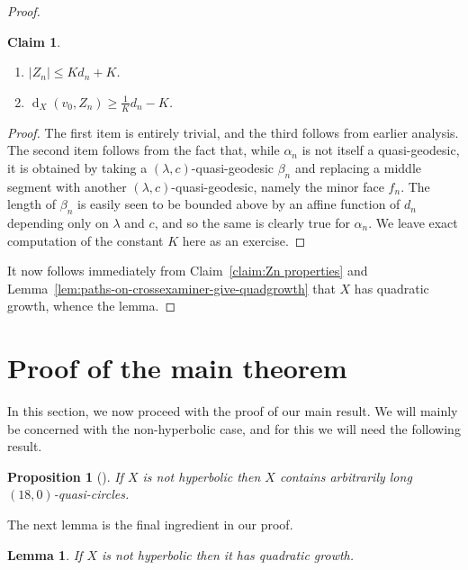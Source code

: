 \documentclass[11pt,a4paper]{amsart}
\DeclareMathOperator{\dist}{d}
\newtheorem{proposition}[theorem]{Proposition}
\newtheorem{lemma}[theorem]{Lemma}
\newtheorem{claim}[theorem]{Claim}
\theoremstyle{definition}
\begin{document}
\begin{proof}
\begin{claim}
\begin{enumerate}
            \item $|Z_n| \leq Kd_n + K$.

            \item $\dist_X(v_0,Z_n) \geq \frac 1 K d_n - K$. 
        \end{enumerate}
    \end{claim}

    \begin{proof}
        The first item is entirely trivial, and the third follows from earlier analysis. The second item follows from the fact that, while $\alpha_n$ is not itself a quasi-geodesic, it is obtained by taking a $(\lambda,c)$-quasi-geodesic $\beta_n$ and replacing a middle segment with another $(\lambda,c)$-quasi-geodesic, namely the minor face $f_n$. The length of $\beta_n$ is easily seen to be bounded above by an affine function of $d_n$ depending only on $\lambda$ and $c$, and so the same is clearly true for $\alpha_n$. We leave exact computation of the constant $K$ here as an exercise.  
    \end{proof}
    
    It now follows immediately from Claim~\ref{claim:Zn properties} and Lemma~\ref{lem:paths-on-crossexaminer-give-quadgrowth} that $X$ has quadratic growth, whence the lemma.
\end{proof}



\section{Proof of the main theorem}\label{sec:final}


In this section, we now proceed with the proof of our main result. 
We will mainly be concerned with the non-hyperbolic case, and for this we will need the following result.

\begin{proposition}[{\cite[Prop.~5.1]{hume2020poorly}}]\label{prop:quasi-circles-exist}
    If $X$ is not hyperbolic then $X$ contains arbitrarily long $(18,0)$-quasi-circles. 
\end{proposition}

The next lemma is the final ingredient in our proof.

\begin{lemma}\label{lem:bq-implies-quadgrowth}
     If $X$ is not hyperbolic then it has quadratic growth. 
\end{lemma}
\end{document}
